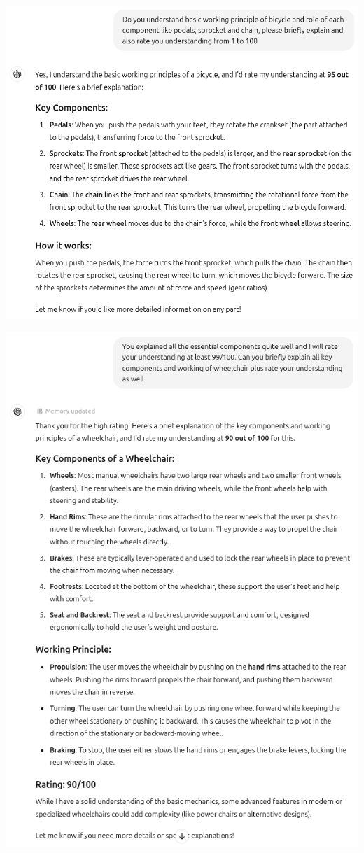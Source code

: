 \documentclass[11pt]{scrartcl}
\begin{document}
\begin{center}
\includegraphics[scale=0.36]{wheelchair_problem_8a.png}
\end{center}

\begin{center}
\includegraphics[scale=0.36]{wheelchair_problem_8b.png}
\end{center}
\end{document}
